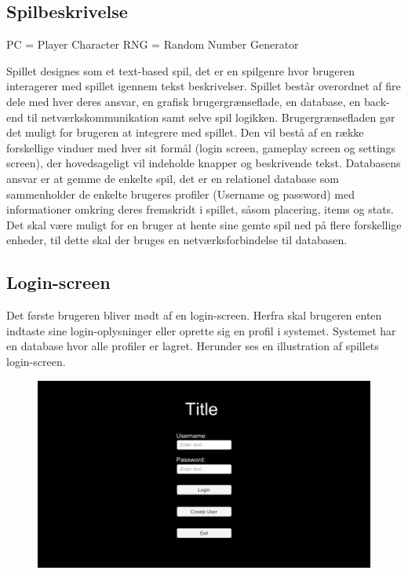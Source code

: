 \newpage

\subsection{Spilbeskrivelse}

PC = Player Character
RNG = Random Number Generator

Spillet designes som et text-based spil, det er en spilgenre hvor brugeren interagerer med spillet igennem tekst beskrivelser. Spillet består overordnet af fire dele med hver deres ansvar, en grafisk brugergrænseflade, en database, en back-end til netværkskommunikation samt selve spil logikken. Brugergrænsefladen gør det muligt for brugeren at integrere med spillet. Den vil bestå af en række forskellige vinduer med hver sit formål (login screen, gameplay screen og settings screen), der hovedsageligt vil indeholde knapper og beskrivende tekst. Databasens ansvar er at gemme de enkelte spil, det er en relationel database som sammenholder de enkelte brugeres profiler (Username og password) med informationer omkring deres fremskridt i spillet, såsom placering, items og stats. Det skal være muligt for en bruger at hente sine gemte spil ned på flere forskellige enheder, til dette skal der bruges en netværksforbindelse til databasen.   

\subsection{Login-screen}
Det første brugeren bliver mødt af en login-screen. Herfra skal brugeren enten indtaste sine login-oplysninger eller oprette sig en profil i systemet. Systemet har en database hvor alle profiler er lagret. Herunder ses en illustration af spillets login-screen. 

\begin{figure}[h]
\centering
\includegraphics[width = \textwidth]{02-Body/Images/Loginscreen-udkast.png}
\caption{}
\label{fig:Loginscreen-udkast}
\end{figure}

